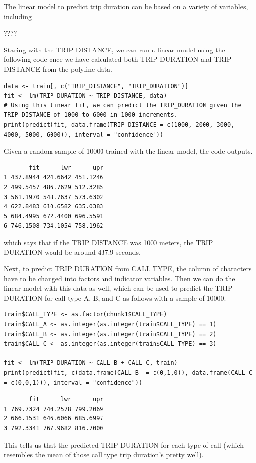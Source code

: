 \documentclass{article}
\numberwithin{equation}{section}
\begin{document}
The linear model to predict trip duration can be based on a variety of variables, including

\indent {}
\indent {}
\indent {}
\indent {}
\indent {} ????

Staring with the TRIP DISTANCE, we can run a linear model using the following code once we have calculated both TRIP DURATION and TRIP DISTANCE from the polyline data.

\begin{lstlisting}
data <- train[, c("TRIP_DISTANCE", "TRIP_DURATION")]
fit <- lm(TRIP_DURATION ~ TRIP_DISTANCE, data)
# Using this linear fit, we can predict the TRIP_DURATION given the TRIP_DISTANCE of 1000 to 6000 in 1000 increments.
print(predict(fit, data.frame(TRIP_DISTANCE = c(1000, 2000, 3000, 4000, 5000, 6000)), interval = "confidence"))
\end{lstlisting}
Given a random sample of 10000 trained with the linear model, the code outputs.

\begin{verbatim}
       fit      lwr      upr
1 437.8944 424.6642 451.1246
2 499.5457 486.7629 512.3285
3 561.1970 548.7637 573.6302
4 622.8483 610.6582 635.0383
5 684.4995 672.4400 696.5591
6 746.1508 734.1054 758.1962
\end{verbatim}

which says that if the TRIP DISTANCE was 1000 meters, the TRIP DURATION would be around 437.9 seconds.

Next, to predict TRIP DURATION from CALL TYPE, the column of characters have to be changed into factors and indicator variables. Then we can do the linear model with this data as well, which can be used to predict the TRIP DURATION for call type A, B, and C as follows with a sample of 10000.
\begin{lstlisting}
train$CALL_TYPE <- as.factor(chunk1$CALL_TYPE)
train$CALL_A <- as.integer(as.integer(train$CALL_TYPE) == 1)
train$CALL_B <- as.integer(as.integer(train$CALL_TYPE) == 2)
train$CALL_C <- as.integer(as.integer(train$CALL_TYPE) == 3)

fit <- lm(TRIP_DURATION ~ CALL_B + CALL_C, train)
print(predict(fit, c(data.frame(CALL_B  = c(0,1,0)), data.frame(CALL_C  = c(0,0,1))), interval = "confidence"))
\end{lstlisting}  

\begin{verbatim}
       fit      lwr      upr
1 769.7324 740.2578 799.2069
2 666.1531 646.6066 685.6997
3 792.3341 767.9682 816.7000
\end{verbatim}
This tells us that the predicted TRIP DURATION for each type of call (which resembles the mean of those call type trip duration's pretty well).
\end{document}
